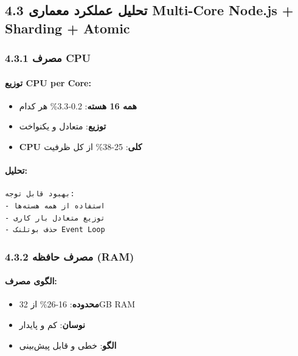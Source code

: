 \documentclass[
]{article}
\providecommand{\tightlist}{%
  \setlength{\itemsep}{0pt}\setlength{\parskip}{0pt}}
\begin{document}
\subsection{4.3 تحلیل عملکرد معماری Multi-Core Node.js + Sharding +
Atomic}\label{ux62aux62dux644ux6ccux644-ux639ux645ux644ux6a9ux631ux62f-ux645ux639ux645ux627ux631ux6cc-multi-core-node.js-sharding-atomic}

\subsubsection{4.3.1 مصرف CPU}\label{ux645ux635ux631ux641-cpu-1}

\paragraph{توزیع CPU per
Core:}\label{ux62aux648ux632ux6ccux639-cpu-per-core-1}

\begin{itemize}
\tightlist
\item
  \textbf{همه 16 هسته}: 0.2-3.3\% هر کدام
\item
  \textbf{توزیع}: متعادل و یکنواخت
\item
  \textbf{CPU کلی}: 25-38\% از کل ظرفیت
\end{itemize}

\paragraph{تحلیل:}\label{ux62aux62dux644ux6ccux644-2}

\begin{verbatim}
بهبود قابل توجه:
- استفاده از همه هسته‌ها
- توزیع متعادل بار کاری
- حذف بوتلنک Event Loop
\end{verbatim}

\subsubsection{4.3.2 مصرف حافظه
(RAM)}\label{ux645ux635ux631ux641-ux62dux627ux641ux638ux647-ram-1}

\paragraph{الگوی
مصرف:}\label{ux627ux644ux6afux648ux6cc-ux645ux635ux631ux641-1}

\begin{itemize}
\tightlist
\item
  \textbf{محدوده}: 16-26\% از 32GB RAM
\item
  \textbf{نوسان}: کم و پایدار
\item
  \textbf{الگو}: خطی و قابل پیش‌بینی
\end{itemize}
\end{document}
